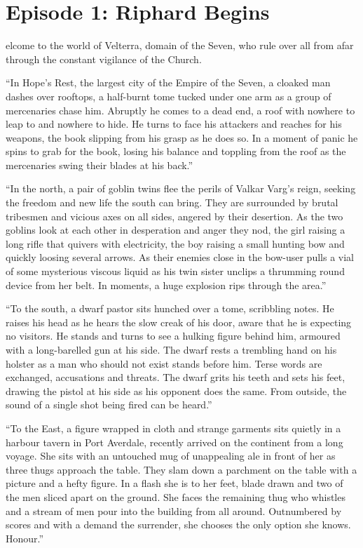 \section{Episode 1: Riphard Begins}

\begin{multicols}{2}

elcome to the world of Velterra, domain of the Seven, who rule over all from afar through the constant vigilance of the Church.\medskip

“In Hope’s Rest, the largest city of the Empire of the Seven, a cloaked man dashes over rooftops, a half-burnt tome tucked under one arm as a group of mercenaries chase him. Abruptly he comes to a dead end, a roof with nowhere to leap to and nowhere to hide. He turns to face his attackers and reaches for his weapons, the book slipping from his grasp as he does so. In a moment of panic he spins to grab for the book, losing his balance and toppling from the roof as the mercenaries swing their blades at his back.”\medskip

“In the north, a pair of goblin twins flee the perils of Valkar Varg’s reign, seeking the freedom and new life the south can bring. They are surrounded by brutal tribesmen and vicious axes on all sides, angered by their desertion. As the two goblins look at each other in desperation and anger they nod, the girl raising a long rifle that quivers with electricity, the boy raising a small hunting bow and quickly loosing several arrows. As their enemies close in the bow-user pulls a vial of some mysterious viscous liquid as his twin sister unclips a thrumming round device from her belt. In moments, a huge explosion rips through the area.”\medskip

“To the south, a dwarf pastor sits hunched over a tome, scribbling notes. He raises his head as he hears the slow creak of his door, aware that he is expecting no visitors. He stands and turns to see a hulking figure behind him, armoured with a long-barelled gun at his side. The dwarf rests a trembling hand on his holster as a man who should not exist stands before him. Terse words are exchanged, accusations and threats. The dwarf grits his teeth and sets his feet, drawing the pistol at his side as his opponent does the same. From outside, the sound of a single shot being fired can be heard.”\medskip

“To the East, a figure wrapped in cloth and strange garments sits quietly in a harbour tavern in Port Averdale, recently arrived on the continent from a long voyage. She sits with an untouched mug of unappealing ale in front of her as three thugs approach the table. They slam down a parchment on the table with a picture and a hefty figure. In a flash she is to her feet, blade drawn and two of the men sliced apart on the ground. She faces the remaining thug who whistles and a stream of men pour into the building from all around. Outnumbered by scores and with a demand the surrender, she chooses the only option she knows. Honour.”\medskip


\end{multicols}
